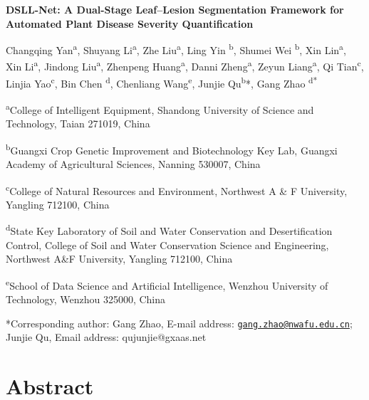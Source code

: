 \documentclass[
]{article}
\author{}
\date{}
\begin{document}
\textbf{DSLL-Net: A Dual-Stage Leaf--Lesion Segmentation Framework for
Automated Plant Disease Severity Quantification}

Changqing Yan\textsuperscript{a}, Shuyang Li\textsuperscript{a}, Zhe
Liu\textsuperscript{a}, Ling Yin \textsuperscript{b}, Shumei Wei
\textsuperscript{b}, Xin Lin\textsuperscript{a}, Xin
Li\textsuperscript{a}, Jindong Liu\textsuperscript{a}, Zhenpeng
Huang\textsuperscript{a}, Danni Zheng\textsuperscript{a}, Zeyun
Liang\textsuperscript{a}, Qi Tian\textsuperscript{c}, Linjia
Yao\textsuperscript{c}, Bin Chen \textsuperscript{d}, Chenliang
Wang\textsuperscript{e}, Junjie Qu\textsuperscript{b}*, Gang Zhao
\textsuperscript{d*}

\textsuperscript{a}College of Intelligent Equipment, Shandong University
of Science and Technology, Taian 271019, China

\textsuperscript{b}Guangxi Crop Genetic Improvement and Biotechnology
Key Lab, Guangxi Academy of Agricultural Sciences, Nanning 530007, China

\textsuperscript{c}College of Natural Resources and Environment,
Northwest A \& F University, Yangling 712100, China

\textsuperscript{d}State Key Laboratory of Soil and Water Conservation
and Desertification Control, College of Soil and Water Conservation
Science and Engineering, Northwest A\&F University, Yangling 712100,
China

\textsuperscript{e}School of Data Science and Artificial Intelligence,
Wenzhou University of Technology, Wenzhou 325000, China

*Corresponding author: Gang Zhao, E-mail address:
\href{mailto:gang.zhao@nwafu.edu.cn}{\nolinkurl{gang.zhao@nwafu.edu.cn}};
Junjie Qu, Email address: qujunjie@gxaas.net

\hypertarget{abstract}{%
\section{Abstract}\label{abstract}}
\end{document}
